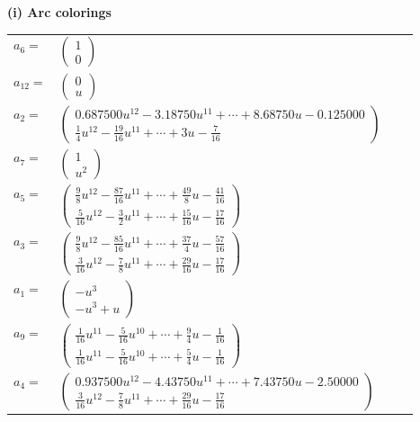 \documentclass[1p]{elsarticle_modified}
\theoremstyle{definition}
\begin{document}
\flushleft \textbf{(i) Arc colorings}\\
\begin{tabular}{m{7pt} m{180pt} m{7pt} m{180pt} }
\flushright $a_{6}=$&$\begin{pmatrix}1\\0\end{pmatrix}$ \\
\flushright $a_{12}=$&$\begin{pmatrix}0\\u\end{pmatrix}$ \\
\flushright $a_{2}=$&$\begin{pmatrix}0.687500 u^{12}-3.18750 u^{11}+\cdots+8.68750 u-0.125000\\\frac{1}{4} u^{12}-\frac{19}{16} u^{11}+\cdots+3 u-\frac{7}{16}\end{pmatrix}$ \\
\flushright $a_{7}=$&$\begin{pmatrix}1\\u^2\end{pmatrix}$ \\
\flushright $a_{5}=$&$\begin{pmatrix}\frac{9}{8} u^{12}-\frac{87}{16} u^{11}+\cdots+\frac{49}{8} u-\frac{41}{16}\\\frac{5}{16} u^{12}-\frac{3}{2} u^{11}+\cdots+\frac{15}{16} u-\frac{17}{16}\end{pmatrix}$ \\
\flushright $a_{3}=$&$\begin{pmatrix}\frac{9}{8} u^{12}-\frac{85}{16} u^{11}+\cdots+\frac{37}{4} u-\frac{57}{16}\\\frac{3}{16} u^{12}-\frac{7}{8} u^{11}+\cdots+\frac{29}{16} u-\frac{17}{16}\end{pmatrix}$ \\
\flushright $a_{1}=$&$\begin{pmatrix}- u^3\\- u^3+u\end{pmatrix}$ \\
\flushright $a_{9}=$&$\begin{pmatrix}\frac{1}{16} u^{11}-\frac{5}{16} u^{10}+\cdots+\frac{9}{4} u-\frac{1}{16}\\\frac{1}{16} u^{11}-\frac{5}{16} u^{10}+\cdots+\frac{5}{4} u-\frac{1}{16}\end{pmatrix}$ \\
\flushright $a_{4}=$&$\begin{pmatrix}0.937500 u^{12}-4.43750 u^{11}+\cdots+7.43750 u-2.50000\\\frac{3}{16} u^{12}-\frac{7}{8} u^{11}+\cdots+\frac{29}{16} u-\frac{17}{16}\end{pmatrix}$ \\

\end{tabular}
\end{document}
